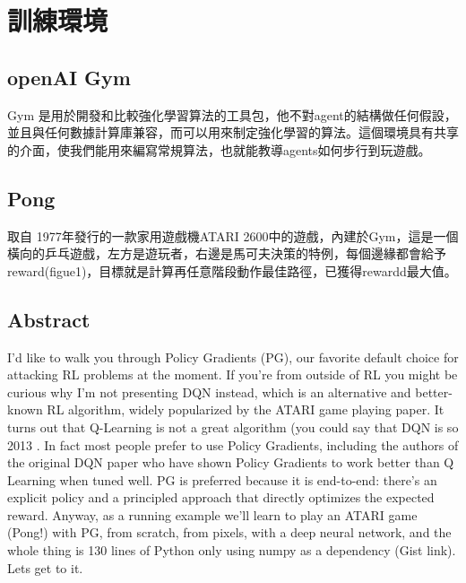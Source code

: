 \documentclass[14pt,a4paper]{report}  %
\begin{document}
\chapter{訓練環境}
\section{openAI Gym}
\qquad Gym 是用於開發和比較強化學習算法的工具包，他不對agent的結構做任何假設，並且與任何數據計算庫兼容，而可以用來制定強化學習的算法。這個環境具有共享的介面，使我們能用來編寫常規算法，也就能教導agents如何步行到玩遊戲。\\[6pt]


\section{Pong}
\qquad 取自 1977年發行的一款家用遊戲機ATARI 2600中的遊戲，內建於Gym，這是一個橫向的乒乓遊戲，左方是遊玩者，右邊是馬可夫決策的特例，每個邊緣都會給予reward(figue1)，目標就是計算再任意階段動作最佳路徑，已獲得rewardd最大值。
\section{Abstract}
\qquad I'd like to walk you through Policy Gradients (PG), our favorite default choice for attacking RL problems at the moment. If you’re from outside of RL you might be curious why I’m not presenting DQN instead, which is an alternative and better-known RL algorithm, widely popularized by the ATARI game playing paper. It turns out that Q-Learning is not a great algorithm (you could say that DQN is so 2013 . In fact most people prefer to use Policy Gradients, including the authors of the original DQN paper who have shown Policy Gradients to work better than Q Learning when tuned well. PG is preferred because it is end-to-end: there's an explicit policy and a principled approach that directly optimizes the expected reward. Anyway, as a running example we'll learn to play an ATARI game (Pong!) with PG, from scratch, from pixels, with a deep neural network, and the whole thing is 130 lines of Python only using numpy as a dependency (Gist link). Lets get to it.
\end{document}
